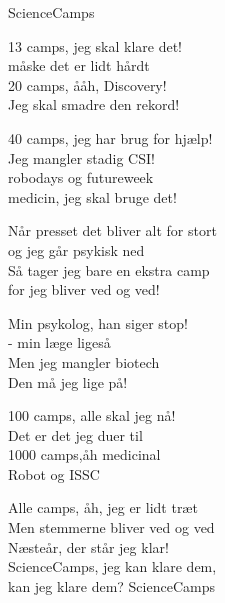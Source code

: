 \begin{song}{ScienceCamps}
  \begin{SBChorus}
    13 camps, jeg skal klare det!\\
    måske det er lidt hårdt\\
    20 camps, ååh, Discovery!\\
    Jeg skal smadre den rekord!
  \end{SBChorus}

  \begin{SBSection*}
    40 camps, jeg har brug for hjælp!\\
    Jeg mangler stadig CSI!\\
    robodays og futureweek\\
    medicin, jeg skal bruge det!
  \end{SBSection*}

  \begin{SBVerse}
    Når presset det bliver alt for stort\\
    og jeg går psykisk ned\\
    Så tager jeg bare en ekstra camp\\
    for jeg bliver ved og ved!
  \end{SBVerse}

  \begin{SBVerse}
    Min psykolog, han siger stop!\\
    - min læge ligeså\\
    Men jeg mangler biotech\\
    Den må jeg lige på!
  \end{SBVerse}

  \begin{SBChorus}
    100 camps, alle skal jeg nå!\\
    Det er det jeg duer til\\
    1000 camps,åh medicinal\\
    Robot og ISSC
  \end{SBChorus}

  \begin{SBSection*}
    Alle camps, åh, jeg er lidt træt\\
    Men stemmerne bliver ved og ved\\
    Næsteår, der står jeg klar!\\
    ScienceCamps, jeg kan klare dem,\\
    kan jeg klare dem? ScienceCamps
  \end{SBSection*}
\end{song}